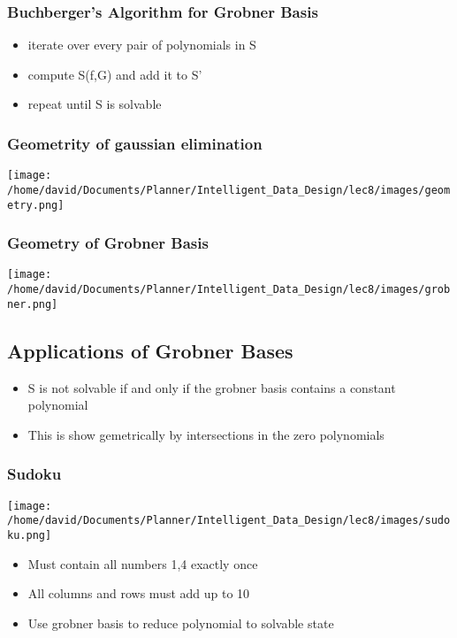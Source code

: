 \documentclass[11pt]{article}
\begin{document}
\subsubsection*{Buchberger's Algorithm for Grobner Basis}
\label{sec:orgddd351b}
\begin{itemize}
\item iterate over every pair of polynomials in S
\item compute S(f,G) and add it to S'
\item repeat until S is solvable
\end{itemize}
\subsubsection*{Geometrity of gaussian elimination}
\label{sec:org64df37f}
\texttt{[image: /home/david/Documents/Planner/Intelligent\_Data\_Design/lec8/images/geometry.png]}
\subsubsection*{Geometry of Grobner Basis}
\label{sec:org412163e}
\texttt{[image: /home/david/Documents/Planner/Intelligent\_Data\_Design/lec8/images/grobner.png]}

\subsection*{Applications of Grobner Bases}
\label{sec:org95d11c5}
\begin{itemize}
\item S is not solvable if and only if the grobner basis contains a constant
polynomial
\item This is show gemetrically by intersections in the zero polynomials
\end{itemize}
\subsubsection*{Sudoku}
\label{sec:orgfaab531}
\texttt{[image: /home/david/Documents/Planner/Intelligent\_Data\_Design/lec8/images/sudoku.png]}
\begin{itemize}
\item Must contain all numbers 1,4 exactly once
\item All columns and rows must add up to 10
\item Use grobner basis to reduce polynomial to solvable state
\end{itemize}
\end{document}
